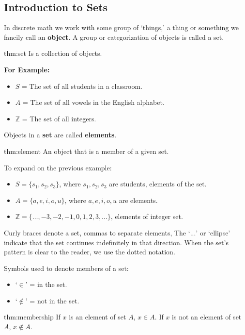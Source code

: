 \subsection{Introduction to Sets}
\hspace*{1em}
In discrete math we work with some group of `things,' a thing or something
we fancily call an \textbf{object}. A group or categorization of objects is called a set.

\begin{theo}[Set]{thm:set}
    Is a collection of objects.
\end{theo}

\noindent
\textbf{For Example:}
\begin{itemize}
    \item $S$ = The set of all students in a classroom.
    \item $A$ = The set of all vowels in the English alphabet.
    \item $\mathbb{Z}$ = The set of all integers.

\end{itemize}
Objects in a \textbf{set} are called \textbf{elements}.

\begin{theo}[Element]{thm:element}
    An object that is a member of a given set.
\end{theo}

\noindent
To expand on the previous example:
\begin{itemize}
    \item $S = \{s_1, s_2, s_3\}$, where $s_1, s_2, s_3$ are students, elements of the set.
    \item $A = \{a, e, i, o, u\}$, where $a, e, i, o, u$ are elements.
    \item $\mathbb{Z} = \{\ldots, -3, -2, -1, 0, 1, 2, 3, \ldots\}$, elements of integer set.
\end{itemize}
Curly braces denote a set, commas to separate elements,
The `$...$' or `ellipse' indicate that the set continues indefinitely in that direction.
When the set's pattern is clear to the reader, we use the dotted notation.

\newpage
\noindent
Symbols used to denote members of a set:
\begin{itemize}
    \item `$\in$' = in the set.
    \item `$\notin$' = not in the set.
\end{itemize}

\begin{theo}[Membership]{thm:membership}
    If $x$ is an element of set $A$, $x \in A$.
    If $x$ is not an element of set $A$, $x \notin A$.
\end{theo}

